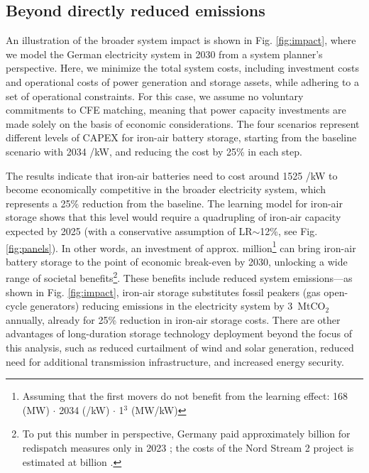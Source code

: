 \documentclass[pdflatex,sn-basic, Numbered]{sn-jnl}
\theoremstyle{thmstyleone}%
\theoremstyle{thmstyletwo}%
\theoremstyle{thmstylethree}%
\begin{document}
\subsection*{Beyond directly reduced emissions}\label{sec4}

An illustration of the broader system impact is shown in Fig. \ref{fig:impact}, where we model the German electricity system in 2030 from a system planner's perspective. Here, we minimize the total system costs, including investment costs and operational costs of power generation and storage assets, while adhering to a set of operational constraints. For this case, we assume no voluntary commitments to CFE matching, meaning that power capacity investments are made solely on the basis of economic considerations. The four scenarios represent different levels of CAPEX for iron-air battery storage, starting from the baseline scenario with 2034 \officialeuro/kW, and reducing the cost by 25\% in each step.

The results indicate that iron-air batteries need to cost around 1525 \officialeuro/kW to become economically competitive in the broader electricity system, which represents a 25\% reduction from the baseline. The learning model for iron-air storage shows that this level would require a quadrupling of iron-air capacity expected by 2025 (with a conservative assumption of LR$\sim$12\%, see Fig. \ref{fig:panels}). In other words, an investment of approx.  million\footnote{Assuming that the first movers do not benefit from the learning effect: 168 (MW) $\cdot$ 2034 (\officialeuro/kW) $\cdot$ 1$^3$ (MW/kW)} can bring iron-air battery storage to the point of economic break-even by 2030, unlocking a wide range of societal benefits\footnote{To put this number in perspective, Germany paid approximately  billion for redispatch measures only in 2023 \cite{titzIdentifyingDriversMitigators2024, bnetzaBundesnetzagenturMonitoringberichte2023}; the  costs of the Nord Stream 2 project is estimated at  billion \cite{cleanenergywireNordStreamSymbol2018}.}. These benefits include reduced system emissions---as shown in Fig. \ref{fig:impact}, iron-air storage substitutes fossil peakers (gas open-cycle generators) reducing emissions in the electricity system by 3~MtCO$_2$ annually, already for 25\% reduction in iron-air storage costs. There are other advantages of long-duration storage technology deployment beyond the focus of this analysis, such as reduced curtailment of wind and solar generation, reduced need for additional transmission infrastructure, and increased energy security.
\end{document}
